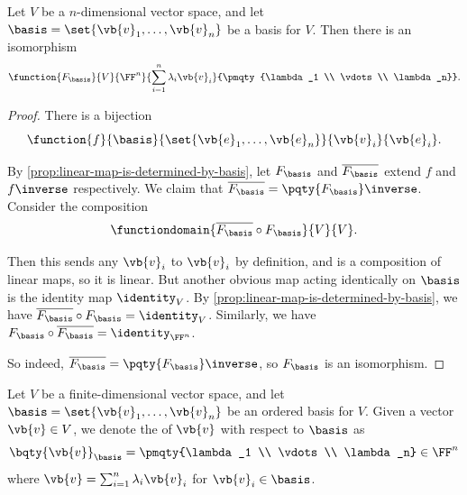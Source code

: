 \begin{corollary}
    \label{cor:isomorphism-between-n-dimensional-vector-space-and-F^n}%
    Let \(V\) be a \(n\)-dimensional vector space, and let \(\basis = \set{\vb{v}_1, \ldots, \vb{v}_n}\) be a basis for \(V\). Then there is an isomorphism
    \[
        \function{F_{\basis}}{V}{\FF^n}{\sum_{i = 1}^{n} \lambda_i \vb{v}_i}{\pmqty{\lambda_1 \\ \vdots \\ \lambda_n}}.
    \]
\end{corollary}

\begin{proof}
    There is a bijection
    \[
        \function{f}{\basis}{\set{\vb{e}_1, \ldots, \vb{e}_n}}{\vb{v}_i}{\vb{e}_i}.
    \]

    By \autoref{prop:linear-map-is-determined-by-basis}, let \(F_{\basis}\) and \(\overline{F_{\basis}}\) extend \(f\) and \(f\inverse\) respectively. We claim that \(\overline{F_{\basis}} = \pqty{F_\basis}\inverse\). Consider the composition
    \[
        \functiondomain{\overline{F_{\basis}} \circ F_{\basis}}{V}{V}.
    \]

    Then this sends any \(\vb{v}_i\) to \(\vb{v}_i\) by definition, and is a composition of linear maps, so it is linear. But another obvious map acting identically on \(\basis\) is the identity map \(\identity_{V}\). By \autoref{prop:linear-map-is-determined-by-basis}, we have \(\overline{F_{\basis}} \circ F_{\basis} = \identity_{V}\). Similarly, we have \(F_{\basis} \circ \overline{F_{\basis}} = \identity_{\FF^n}\).

    So indeed, \(\overline{F_{\basis}} = \pqty{F_\basis}\inverse\), so \(F_{\basis}\) is an isomorphism.
\end{proof}

\begin{definition}
    Let \(V\) be a finite-dimensional vector space, and let \(\basis = \set{\vb{v}_1, \ldots, \vb{v}_n}\) be an ordered basis for \(V\). Given a vector \(\vb{v} \in V\), we denote the  of \(\vb{v}\) with respect to \(\basis\) as
    \[
        \bqty{\vb{v}}_{\basis} = \pmqty{\lambda_1 \\ \vdots \\ \lambda_n} \in \FF^n
    \]
    where \(\vb{v} = \sum_{i = 1}^{n} \lambda_i \vb{v}_i\) for \(\vb{v}_i \in \basis\).
\end{definition}

